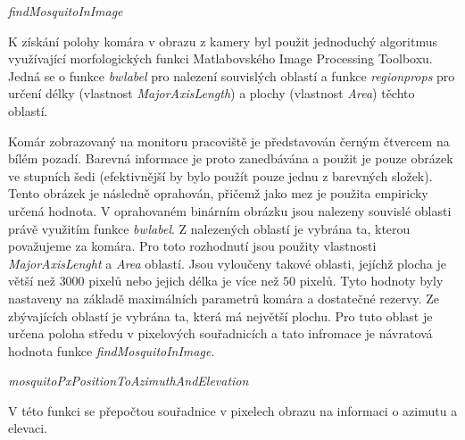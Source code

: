 \documentclass[a4paper,10pt]{article}
\begin{document}
\vspace{0.5cm}
\textit{findMosquitoInImage}

K získání polohy komára v obrazu z kamery byl použit jednoduchý algoritmus využívající morfologických funkci Matlabovského Image Processing Toolboxu. Jedná se o funkce \textit{bwlabel} pro nalezení souvislých oblastí a funkce \textit{regionprops} pro určení délky (vlastnost \textit{MajorAxisLength}) a plochy (vlastnost \textit{Area}) těchto oblastí.

Komár zobrazovaný na monitoru pracoviště je představován černým čtvercem na bílém pozadí. Barevná informace je proto zanedbávána a použit je pouze obrázek ve stupních šedi (efektivnější by bylo použít pouze jednu z barevných složek). Tento obrázek je následně oprahován, přičemž jako mez je použita empiricky určená hodnota. V oprahovaném binárním obrázku jsou nalezeny souvislé oblasti právě využitím funkce \textit{bwlabel}. Z nalezených oblastí je vybrána ta, kterou považujeme za komára. Pro toto rozhodnutí jsou použity vlastnosti \textit{MajorAxisLenght} a \textit{Area} oblastí. Jsou vyloučeny takové oblasti, jejíchž plocha je větší než $3000$ pixelů nebo jejich délka je více než $50$ pixelů. Tyto hodnoty byly nastaveny na základě maximálních parametrů komára a dostatečné rezervy. Ze zbývajících oblastí je vybrána ta, která má největší plochu. Pro tuto oblast je určena poloha středu v pixelových souřadnicích a tato infromace je návratová hodnota funkce \textit{findMosquitoInImage}.


\vspace{0.5cm}
\textit{mosquitoPxPositionToAzimuthAndElevation}

V této funkci se přepočtou souřadnice v pixelech obrazu na informaci o azimutu a elevaci.
\end{document}
